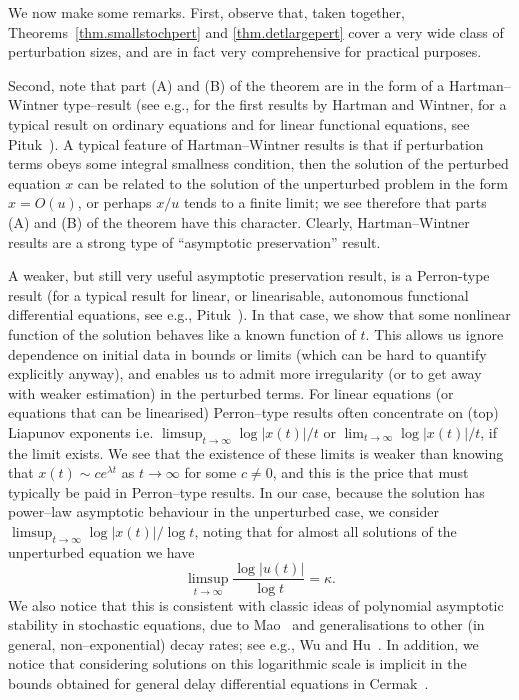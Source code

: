 \documentclass[a4paper,10pt,reqno]{amsart}
\numberwithin{equation}{section}
\theoremstyle{definition}
\theoremstyle{remark}
\DeclareMathOperator{\1}{\mathbbm 1}
\begin{document}
We now make some remarks. First, observe that, taken together, Theorems~\ref{thm.smallstochpert} and \ref{thm.detlargepert} cover a very wide class of perturbation sizes, and are in fact very   comprehensive for practical purposes. 

Second, note that part (A) and (B) of the theorem are in the form of a Hartman--Wintner type--result (see e.g.,  \cite{HW55} for the first results by Hartman and Wintner, \cite[Cor X.16.4]{Hart2002} for a typical result on ordinary equations and for linear functional equations, see Pituk~\cite{Pituk2002}). A typical feature of Hartman--Wintner results is that if perturbation terms obeys some integral smallness condition, then the solution of the perturbed equation $x$ can be related to the solution of the unperturbed problem in the form $x=O(u)$, or perhaps $x/u$ tends to a finite limit; we see therefore that parts (A) and (B) of the theorem have this character. Clearly, Hartman--Wintner results are a strong type of ``asymptotic preservation'' result. 

A weaker, but still very useful asymptotic preservation result, is a Perron-type result (for a typical result for linear, or linearisable, autonomous functional differential equations, see e.g., Pituk~\cite{Pituk2006}). In that case,  we show that some nonlinear function of the solution behaves like a known function of $t$. This allows us ignore dependence on initial data in bounds or limits (which can be hard to quantify explicitly anyway), and enables us to admit more irregularity (or to get away with weaker estimation) in the perturbed terms. For linear equations (or equations that can be linearised) Perron--type results often concentrate on (top) Liapunov exponents i.e. $\limsup_{t\to\infty} \log|x(t)|/t$ or $\lim_{t\to\infty} \log |x(t)|/t$, if the limit exists. We see that the existence of these limits is weaker than knowing that $x(t)\sim ce^{\lambda t}$ as $t\to\infty$ for some $c\neq 0$, and this is the price that must typically be paid in Perron--type results. In our case, because the solution has power--law asymptotic behaviour in the unperturbed case, we consider $\limsup_{t\to\infty} \log |x(t)|/\log t$, noting that for almost all solutions of the unperturbed equation we have 
\[
\limsup_{t\to\infty} \frac{\log |u(t)|}{\log t} =\kappa.
\]
We also notice that this is consistent with classic ideas of polynomial asymptotic stability in stochastic equations, due to Mao~\cite{Mao1992a,Mao1992b} and generalisations to other (in general, non--exponential) decay rates; see e.g.,  
Wu and Hu~\cite{WuHu2012}. In addition, we notice that considering solutions on this logarithmic scale is implicit in the bounds obtained for general delay differential equations in Cermak~\cite{cermak}. 
\end{document}
